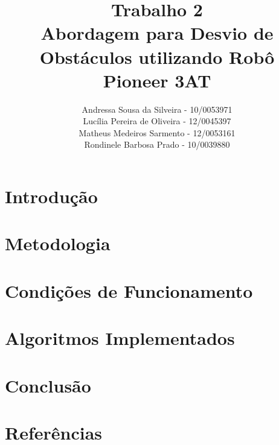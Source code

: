 \documentclass[11pt,a4paper]{article}
\title{
Trabalho 2 \\ Abordagem para Desvio de Obstáculos utilizando Robô Pioneer 3AT
}
\author{
Andressa Sousa da Silveira - 10/0053971 \\
Lucília Pereira de Oliveira - 12/0045397 \\
Matheus Medeiros Sarmento - 12/0053161 \\
Rondinele Barbosa Prado - 10/0039880 \\
%
}
\begin{document}
\maketitle
\lstset{language=C++} 


\thispagestyle{empty}
\pagestyle{empty}

\section{Introdução}


\section{Metodologia}


\section{Condições de Funcionamento}


\section{Algoritmos Implementados}


\section{Conclusão}


\section{Referências}

\end{document}
